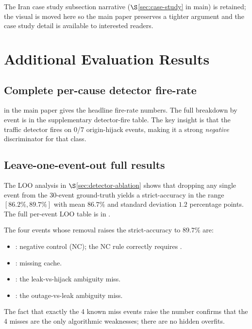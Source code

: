 \documentclass[sigcomm,nonatbib]{acmart}
\begin{document}
The Iran case study subsection narrative
($\S$\ref{sec:case-study} in main) is retained; the visual is
moved here so the main paper preserves a tighter argument and
the case study detail is available to interested readers.


\section{Additional Evaluation Results}
\label{supp:eval-our}

\subsection{Complete per-cause detector fire-rate}
\label{supp:detector-fire}

 in the main paper gives the headline
fire-rate numbers. The full breakdown by event is in
the supplementary detector-fire
table. The key insight
is that the traffic detector fires on 0/7 origin-hijack events,
making it a strong \emph{negative} discriminator for that class.

\subsection{Leave-one-event-out full results}
\label{supp:loo-full}

The LOO analysis in $\S$\ref{sec:detector-ablation} shows that
dropping any single event from the 30-event ground-truth
yields a strict-accuracy in the range $[86.2\%, 89.7\%]$ with
mean $86.7\%$ and standard deviation $1.2$ percentage points.
The full per-event LOO table is in
.

The four events whose removal raises the strict-accuracy to
$89.7\%$ are:
\begin{itemize}
 \item : negative control (NC); the NC
 rule correctly requires .
 \item : missing cache.
 \item : the leak-vs-hijack
 ambiguity miss.
 \item : the outage-vs-leak
 ambiguity miss.
\end{itemize}
The fact that exactly the 4 known miss events raise the number
confirms that the 4 misses are the only algorithmic weaknesses;
there are no hidden overfits.
\end{document}
